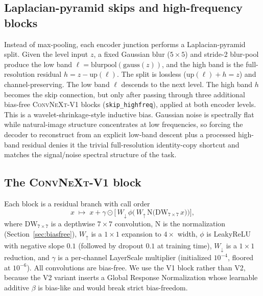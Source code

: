 \documentclass{article}
\newcommand{\convnext}{\textsc{ConvNeXt}}
\begin{document}
\subsection{Laplacian-pyramid skips and high-frequency blocks}
\label{sec:laplacian}
Instead of max-pooling, each encoder junction performs a Laplacian-pyramid split. Given the level input $z$, a fixed Gaussian blur ($5{\times}5$) and stride-2 blur-pool produce the low band $\ell = \mathrm{blurpool}(\mathrm{gauss}(z))$, and the high band is the full-resolution residual $h = z - \mathrm{up}(\ell)$. The split is lossless ($\mathrm{up}(\ell)+h = z$) and channel-preserving. The low band $\ell$ descends to the next level. The high band $h$ becomes the skip connection, but only after passing through three additional bias-free \convnext{}-V1 blocks (\texttt{skip\_highfreq}), applied at both encoder levels. This is a wavelet-shrinkage-style inductive bias. Gaussian noise is spectrally flat while natural-image structure concentrates at low frequencies, so forcing the decoder to reconstruct from an explicit low-band descent plus a processed high-band residual denies it the trivial full-resolution identity-copy shortcut and matches the signal/noise spectral structure of the task.

\subsection{The \convnext{}-V1 block}
\label{sec:block}
Each block is a residual branch with call order
\[
x \;\mapsto\; x + \gamma \odot \Big[\, W_{\downarrow}\,\phi\big(\,W_{\uparrow}\,\mathrm{N}\big(\mathrm{DW}_{7\times7}\,x\big)\big)\Big],
\]
where $\mathrm{DW}_{7\times7}$ is a depthwise $7{\times}7$ convolution, $\mathrm{N}$ is the normalization (Section~\ref{sec:biasfree}), $W_{\uparrow}$ is a $1{\times}1$ expansion to $4\times$ width, $\phi$ is LeakyReLU with negative slope $0.1$ (followed by dropout $0.1$ at training time), $W_{\downarrow}$ is a $1{\times}1$ reduction, and $\gamma$ is a per-channel LayerScale multiplier (initialized $10^{-4}$, floored at $10^{-6}$). All convolutions are bias-free. We use the V1 block rather than V2, because the V2 variant inserts a Global Response Normalization whose learnable additive $\beta$ is bias-like and would break strict bias-freedom.
\end{document}
